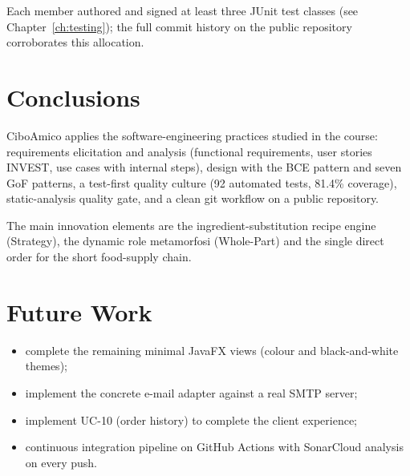 Each member authored and signed at least three JUnit test classes (see
Chapter~\ref{ch:testing}); the full commit history on the public
repository corroborates this allocation.

\section{Conclusions}

CiboAmico applies the software-engineering practices studied in the course:
requirements elicitation and analysis (functional requirements, user stories
INVEST, use cases with internal steps), design with the BCE pattern and seven
GoF patterns, a test-first quality culture (92 automated tests, 81.4\%
coverage), static-analysis quality gate, and a clean git workflow on a public
repository.

The main innovation elements are the ingredient-substitution recipe engine
(Strategy), the dynamic role metamorfosi (Whole-Part) and the single direct
order for the short food-supply chain.

\section{Future Work}

\begin{itemize}
    \item complete the remaining minimal JavaFX views (colour and
    black-and-white themes);
    \item implement the concrete e-mail adapter against a real SMTP server;
    \item implement UC-10 (order history) to complete the client experience;
    \item continuous integration pipeline on GitHub Actions with SonarCloud
    analysis on every push.
\end{itemize}
